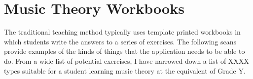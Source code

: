 \section{Music Theory Workbooks}

The traditional teaching method typically uses template printed workbooks in which students write the answers to a series of exercises.  The following scans provide examples of the kinds of things that the application needs to be able to do.
From a wide list of potential exercises, I have narrowed down a list of XXXX types suitable for a student learning music theory at the equivalent of Grade Y. 


